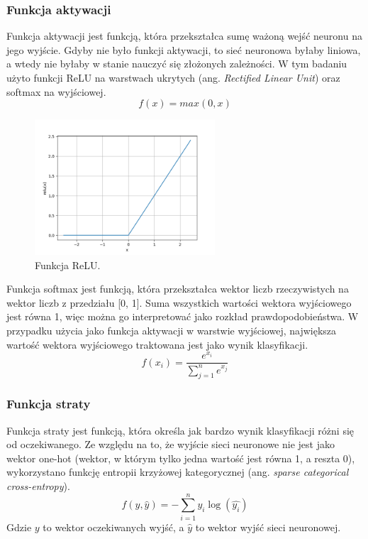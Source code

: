 \subsubsection{Funkcja aktywacji}\label{subsubsec:funkcja_aktywacji}
Funkcja aktywacji jest funkcją, która przekształca sumę ważoną wejść neuronu na jego wyjście.
Gdyby nie było funkcji aktywacji, to sieć neuronowa byłaby liniowa, a wtedy nie byłaby w stanie nauczyć się złożonych zależności.
W tym badaniu użyto funkcji ReLU na warstwach ukrytych (ang. \textit{Rectified Linear Unit}) oraz softmax na wyjściowej.
\begin{equation}
    f(x) = max(0, x)
\end{equation}
\begin{figure}[H]
    \centering
    \includegraphics[width=0.6\textwidth]{img/relu.png}
    \caption{Funkcja ReLU.}
    \label{fig:relu}
\end{figure}
Funkcja softmax jest funkcją, która przekształca wektor liczb rzeczywistych na wektor liczb z przedziału [0, 1].
Suma wszystkich wartości wektora wyjściowego jest równa 1, więc można go interpretować jako rozkład prawdopodobieństwa.
W przypadku użycia jako funkcja aktywacji w warstwie wyjściowej, największa wartość wektora wyjściowego traktowana jest jako wynik klasyfikacji.
\begin{equation}
    \label{eq:softmax}
    f(x_i) = \frac{e^{x_i}}{\sum_{j=1}^{n} e^{x_j}}
\end{equation}
\subsubsection{Funkcja straty}\label{subsubsec:funkcja_straty}
Funkcja straty jest funkcją, która określa jak bardzo wynik klasyfikacji różni się od oczekiwanego.
Ze względu na to, że wyjście sieci neuronowe nie jest jako wektor one-hot
(wektor, w którym tylko jedna wartość jest równa 1, a reszta 0),
wykorzystano funkcję entropii krzyżowej kategorycznej (ang. \textit{sparse categorical cross-entropy}).
\begin{equation}
    f(y, \hat{y}) = -\sum_{i=1}^{n} y_i \log(\hat{y_i})
\end{equation}
Gdzie $y$ to wektor oczekiwanych wyjść, a $\hat{y}$ to wektor wyjść sieci neuronowej.
